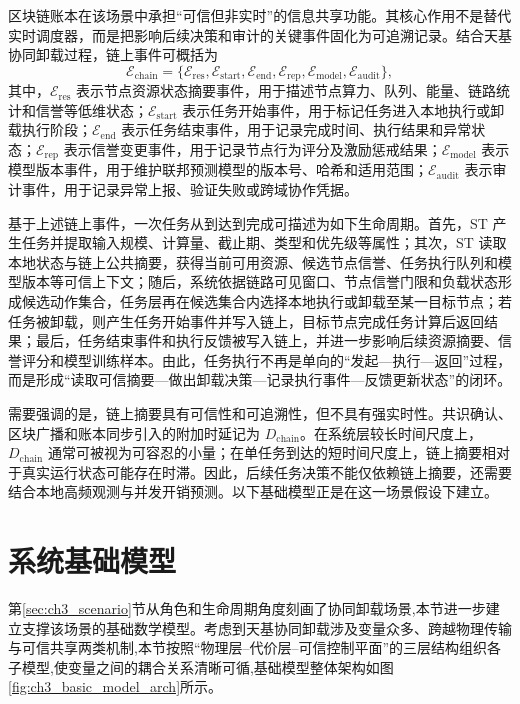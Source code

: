 区块链账本在该场景中承担``可信但非实时''的信息共享功能。其核心作用不是替代实时调度器，而是把影响后续决策和审计的关键事件固化为可追溯记录。结合天基协同卸载过程，链上事件可概括为
\begin{equation}
    \mathcal{E}_{\mathrm{chain}}=
    \{\mathcal{E}_{\mathrm{res}},\mathcal{E}_{\mathrm{start}},\mathcal{E}_{\mathrm{end}},
    \mathcal{E}_{\mathrm{rep}},\mathcal{E}_{\mathrm{model}},\mathcal{E}_{\mathrm{audit}}\},
    \label{eq:ch3_chain_event_types}
\end{equation}
其中，$\mathcal{E}_{\mathrm{res}}$ 表示节点资源状态摘要事件，用于描述节点算力、队列、能量、链路统计和信誉等低维状态；$\mathcal{E}_{\mathrm{start}}$ 表示任务开始事件，用于标记任务进入本地执行或卸载执行阶段；$\mathcal{E}_{\mathrm{end}}$ 表示任务结束事件，用于记录完成时间、执行结果和异常状态；$\mathcal{E}_{\mathrm{rep}}$ 表示信誉变更事件，用于记录节点行为评分及激励惩戒结果；$\mathcal{E}_{\mathrm{model}}$ 表示模型版本事件，用于维护联邦预测模型的版本号、哈希和适用范围；$\mathcal{E}_{\mathrm{audit}}$ 表示审计事件，用于记录异常上报、验证失败或跨域协作凭据。

基于上述链上事件，一次任务从到达到完成可描述为如下生命周期。首先，ST 产生任务并提取输入规模、计算量、截止期、类型和优先级等属性；其次，ST 读取本地状态与链上公共摘要，获得当前可用资源、候选节点信誉、任务执行队列和模型版本等可信上下文；随后，系统依据链路可见窗口、节点信誉门限和负载状态形成候选动作集合，任务层再在候选集合内选择本地执行或卸载至某一目标节点；若任务被卸载，则产生任务开始事件并写入链上，目标节点完成任务计算后返回结果；最后，任务结束事件和执行反馈被写入链上，并进一步影响后续资源摘要、信誉评分和模型训练样本。由此，任务执行不再是单向的``发起—执行—返回''过程，而是形成``读取可信摘要—做出卸载决策—记录执行事件—反馈更新状态''的闭环。

需要强调的是，链上摘要具有可信性和可追溯性，但不具有强实时性。共识确认、区块广播和账本同步引入的附加时延记为 $D_{\mathrm{chain}}$。在系统层较长时间尺度上，$D_{\mathrm{chain}}$ 通常可被视为可容忍的小量；在单任务到达的短时间尺度上，链上摘要相对于真实运行状态可能存在时滞。因此，后续任务决策不能仅依赖链上摘要，还需要结合本地高频观测与并发开销预测。以下基础模型正是在这一场景假设下建立。

\section{系统基础模型}
\label{sec:ch3_basic_model}

第\ref{sec:ch3_scenario}节从角色和生命周期角度刻画了协同卸载场景,本节进一步建立支撑该场景的基础数学模型。考虑到天基协同卸载涉及变量众多、跨越物理传输与可信共享两类机制,本节按照``物理层--代价层--可信控制平面''的三层结构组织各子模型,使变量之间的耦合关系清晰可循,基础模型整体架构如图\ref{fig:ch3_basic_model_arch}所示。

